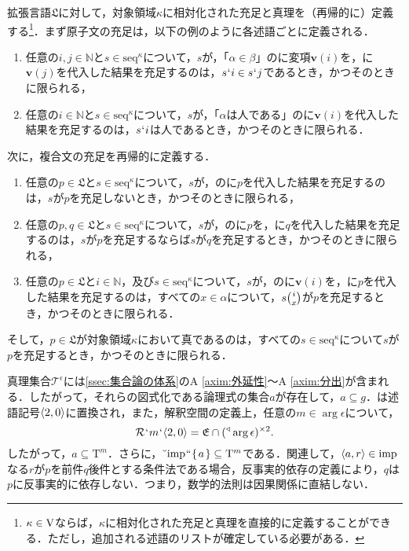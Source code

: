 拡張言語$\mathfrak{L}$に対して，対象領域$\kappa$に相対化された充足と真理を（再帰的に）定義する\footnote{
    $\kappa\in\mathrm{V}$ならば，$\kappa$に相対化された充足と真理を直接的に定義することができる．ただし，追加される述語のリストが確定している必要がある．
}．まず原子文の充足は，以下の例のように各述語ごとに定義される．
\begin{enumerate}[label=(\arabic*)]
    \item 任意の$ i,j\in\mathbb{N} $と$ s\in\mathrm{seq}^{\kappa} $について，$s$が，「$\alpha\in\beta$」の\kagi{$ \alpha $}に変項$ \boldsymbol{v}(i) $を，\kagi{$ \beta $}に$ \boldsymbol{v}(j) $を代入した結果を充足するのは，$ s{\mspace{1mu}{`}\mspace{1mu}} i\in s{\mspace{1mu}{`}\mspace{1mu}} j $であるとき，かつそのときに限られる，
    \item 任意の$ i\in\mathbb{N} $と$ s\in\mathrm{seq}^{\kappa} $について，$s$が，「$\alpha$は人である」の\kagi{$ \alpha $}に$ \boldsymbol{v}(i) $を代入した結果を充足するのは，$ s{\mspace{1mu}{`}\mspace{1mu}} i $は人であるとき，かつそのときに限られる．
\end{enumerate}
次に，複合文の充足を再帰的に定義する．
\begin{enumerate}[label=(\arabic*),start=3]
    \item 任意の$p\in\mathfrak{L}$と$ s\in\mathrm{seq}^{\kappa} $について，$s$が，のに$p$を代入した結果を充足するのは，$ s $が$p$を充足しないとき，かつそのときに限られる，
    \item 任意の$p,q\in\mathfrak{L}$と$ s\in\mathrm{seq}^{\kappa} $について，$s$が，のに$p$を，に$q$を代入した結果を充足するのは，$ s $が$p$を充足するならば$s$が$q$を充足するとき，かつそのときに限られる，
    \item 任意の$p\in\mathfrak{L}$と$ i\in\mathbb{N} $，及び$ s\in\mathrm{seq}^{\kappa} $について，$s$が，の\kagi{$ \alpha $}に$ \boldsymbol{v}(i) $を，に$p$を代入した結果を充足するのは，すべての$ x\in \alpha $について，$s\tbinom{i}{x}$が$p$を充足するとき，かつそのときに限られる．
\end{enumerate}
そして，$p\in\mathfrak{L}$が対象領域$ \kappa $において真であるのは，すべての$s\in \mathrm{seq}^{\kappa}$について$s$が$p$を充足するとき，かつそのときに限られる．

真理集合$ \mathcal{T}^\epsilon $には\ref{ssec:集合論の体系}のA \ref{axim:外延性}〜A \ref{axim:分出}が含まれる．したがって，それらの図式化である論理式の集合$a$が存在して，$a\subseteq g$．\kagi{$\in$}は述語記号$\langle 2,0 \rangle$に置換され，また，解釈空間の定義上，任意の$m\in\arg\epsilon$について，
\[
    \mathcal{R}{\mspace{1mu}{`}\mspace{1mu}} m{\mspace{1mu}{`}\mspace{1mu}}\langle 2,0 \rangle=\mathfrak{E}\cap({^\triangleleft}\arg\epsilon)^{\times 2}.
\]
したがって，$ a\subseteq\mathrm{T}^m $．さらに，$ \breve{\:\:}\mathrm{imp}{\mspace{1mu}{``}\mspace{1mu}}\{\mspace{2mu}a\mspace{2mu}\}\subseteq\mathrm{T}^m $である．関連して，$ \langle a,r \rangle\in\mathrm{imp} $なる$r$が$p$を前件$q$後件とする条件法である場合，反事実的依存の定義により，$q$は$p$に反事実的に依存しない．つまり，数学的法則は因果関係に直結しない．

